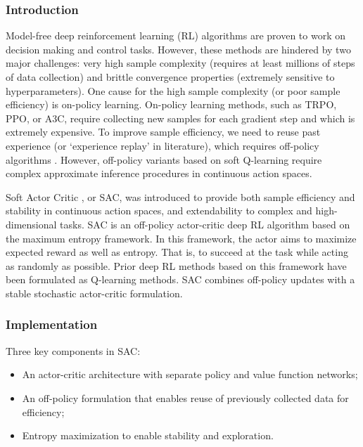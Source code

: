 \documentclass[lang=en,mode=normal,device=normal,color=blue,12pt]{elegantnote}
\DeclareMathOperator*{\1}{\mathbbm{1}}
\begin{document}
\subsubsection{Introduction}



Model-free deep reinforcement learning (RL) algorithms are proven to work on decision making and control tasks. However, these methods are hindered by two major challenges: very high sample complexity (requires at least millions of steps of data collection) and brittle convergence properties (extremely sensitive to hyperparameters).
One cause for the high sample complexity (or poor sample efficiency) is on-policy learning. On-policy learning methods, such as TRPO, PPO, or A3C, require collecting new samples for each gradient step and which is extremely expensive.
To improve sample efficiency, we need to reuse past experience (or `experience replay' in literature), which requires off-policy algorithms  \cite{mnih2013playing}. However, off-policy variants based on soft Q-learning require complex approximate inference procedures in continuous action spaces. 


Soft Actor Critic \cite{haarnoja2018soft}, or SAC, was introduced to provide both sample efficiency and stability in continuous action spaces, and extendability to complex and high-dimensional tasks. SAC is an off-policy actor-critic deep RL algorithm based on the maximum entropy framework. In this framework, the actor aims to maximize expected reward as well as entropy. That is, to succeed at the task while acting as randomly as possible. Prior deep RL methods based on this framework have been formulated as Q-learning methods. SAC combines off-policy updates with a stable stochastic actor-critic formulation.


%
%

\subsubsection{Implementation}

Three key components in SAC:

\begin{itemize}
\item An actor-critic architecture with separate policy and value function networks;
\item An off-policy formulation that enables reuse of previously collected data for efficiency;
\item Entropy maximization to enable stability and exploration.
\end{itemize}
\end{document}
